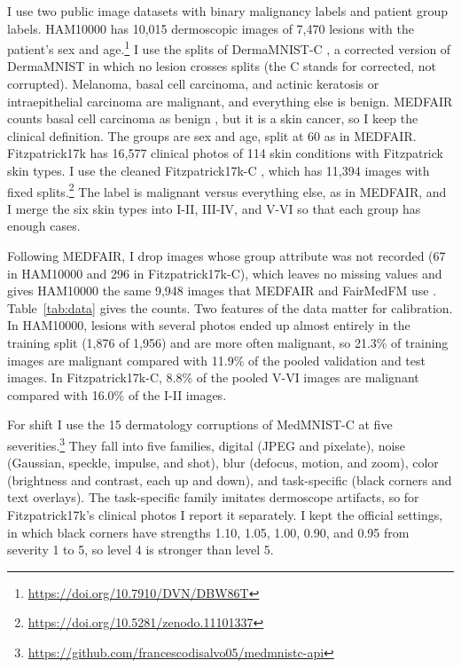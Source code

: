 \documentclass[sigconf,nonacm]{acmart}
\begin{document}
I use two public image datasets with binary malignancy labels and patient group labels. HAM10000 \cite{tschandl2018ham10000} has 10,015 dermoscopic images of 7,470 lesions with the patient's sex and age.\footnote{\url{https://doi.org/10.7910/DVN/DBW86T}} I use the splits of DermaMNIST-C \cite{abhishek2025quality}, a corrected version of DermaMNIST in which no lesion crosses splits (the C stands for corrected, not corrupted). Melanoma, basal cell carcinoma, and actinic keratosis or intraepithelial carcinoma are malignant, and everything else is benign. MEDFAIR counts basal cell carcinoma as benign \cite{zong2023medfair}, but it is a skin cancer, so I keep the clinical definition. The groups are sex and age, split at 60 as in MEDFAIR. Fitzpatrick17k \cite{groh2021fitzpatrick} has 16,577 clinical photos of 114 skin conditions with Fitzpatrick skin types. I use the cleaned Fitzpatrick17k-C \cite{abhishek2025quality}, which has 11,394 images with fixed splits.\footnote{\url{https://doi.org/10.5281/zenodo.11101337}} The label is malignant versus everything else, as in MEDFAIR, and I merge the six skin types into I-II, III-IV, and V-VI so that each group has enough cases.

Following MEDFAIR, I drop images whose group attribute was not recorded (67 in HAM10000 and 296 in Fitzpatrick17k-C), which leaves no missing values and gives HAM10000 the same 9,948 images that MEDFAIR and FairMedFM use \cite{zong2023medfair,jin2024fairmedfm}. Table~\ref{tab:data} gives the counts. Two features of the data matter for calibration. In HAM10000, lesions with several photos ended up almost entirely in the training split (1,876 of 1,956) and are more often malignant, so 21.3\% of training images are malignant compared with 11.9\% of the pooled validation and test images. In Fitzpatrick17k-C, 8.8\% of the pooled V-VI images are malignant compared with 16.0\% of the I-II images.

For shift I use the 15 dermatology corruptions of MedMNIST-C \cite{disalvo2024medmnistc} at five severities.\footnote{\url{https://github.com/francescodisalvo05/medmnistc-api}} They fall into five families, digital (JPEG and pixelate), noise (Gaussian, speckle, impulse, and shot), blur (defocus, motion, and zoom), color (brightness and contrast, each up and down), and task-specific (black corners and text overlays). The task-specific family imitates dermoscope artifacts, so for Fitzpatrick17k's clinical photos I report it separately. I kept the official settings, in which black corners have strengths 1.10, 1.05, 1.00, 0.90, and 0.95 from severity 1 to 5, so level 4 is stronger than level 5.
\end{document}

